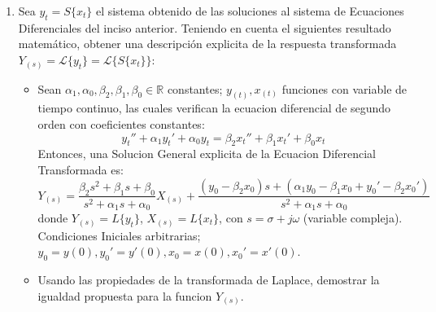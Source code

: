\documentclass[12pt,a4paper]{report}
\begin{document}
\begin{enumerate}[label=\alph*)]
  \item Sea $y_t = S\{x_t\}$ el sistema obtenido de las soluciones al sistema de Ecuaciones Diferenciales del inciso
    anterior. Teniendo en cuenta el siguientes resultado matemático, obtener una descripción explicita de la respuesta
    transformada $Y_{(s)} = \mathcal{L}\{y_t\} = \mathcal{L}\{S\{x_t\}\}$:
    \begin{itemize}
      \item Sean $\alpha_1, \alpha_0, \beta_2, \beta_1, \beta_0 \in \mathbb{R}$ constantes; $y_{(t)}, x_{(t)}$ funciones
        con variable de tiempo continuo, las cuales verifican la ecuacion diferencial de segundo orden con coeficientes
        constantes:
        $$y_t'' + \alpha_1 y_t' + \alpha_0 y_t = \beta_2 x_t'' + \beta_1 x_t' + \beta_0 x_t$$
        Entonces, una Solucion General explicita de la Ecuacion Diferencial Transformada es:
        $$Y_{(s)} = \frac{\beta_2 s^2 + \beta_1 s + \beta_0}{s^2 + \alpha_1 s + \alpha_0}X_{(s)} + \frac{(y_0 - \beta_2 x_0)
          s + (\alpha_1 y_0 - \beta_1 x_0 + y_0' - \beta_2 x_0')}{s^2 + \alpha_1 s + \alpha_0}$$
        donde $Y_{(s)} = L\{y_t\}$, $X_{(s)} = L\{x_t\}$, con $s = \sigma + j \omega$ (variable compleja). Condiciones
        Iniciales arbitrarias; $y_0 = y(0), y_0' = y'(0), x_0 = x(0), x_0' = x'(0)$.
      \item Usando las propiedades de la transformada de Laplace, demostrar la igualdad propuesta para la funcion
      $Y_{(s)}$.
    \end{itemize}


\end{enumerate}
\end{document}
